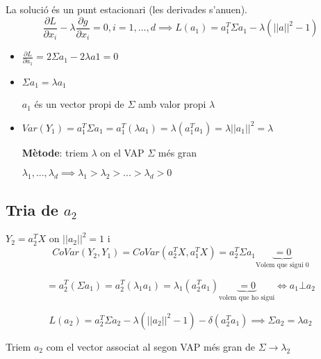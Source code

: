 \documentclass[a4paper]{article}
\begin{document}
La solució és un punt estacionari (les derivades s'anu\lgem en).
$$  \frac{\partial L}{\partial x_i} - \lambda \frac{\partial g}{\partial x_i} = 0, i = 1, ..., d \implies L(a_1) = a_1^T\Sigma a_1 - \lambda(||a||^2 - 1)  $$

\begin{itemize}
	\item $\frac{\partial L}{\partial a_1} = 2\Sigma a_1 - 2\lambda a1 = 0$
	\item $\Sigma a_1 = \lambda a_1$
	
	$a_1$ és un vector propi de $\Sigma$ amb valor propi $\lambda$
	\item $Var(Y_1) = a_1^T\Sigma a_1=a_1^T(\lambda a_1) = \lambda(a_1^T a_1) = \lambda ||a_1||^2 = \lambda$
	
	\textbf{Mètode}: triem $\lambda$ on el VAP $\Sigma$ més gran
	
	$\lambda_1, ..., \lambda_d \implies \lambda_1 > \lambda_2 > ... > \lambda_d > 0$
\end{itemize}

\subsection{Tria de $a_2$}

$Y_2 = a_2^TX$ on $||a_2||^2 = 1$ i $$ CoVar(Y_2, Y_1) = CoVar(a_2^TX, a_1^TX) = a_2^T\Sigma a_1 \underbrace{= 0}_\text{Volem que sigui 0} $$ 

$$  = a_2^T(\Sigma a_1) = a_2^T(\lambda_1 a_1) = \lambda_1 (a_2^Ta_1) \underbrace{= 0}_\text{volem que ho sigui} \Leftrightarrow a_1 \bot a_2  $$

$$  L(a_2) = a_2^T\Sigma a_2 - \lambda(||a_2||^2 - 1) - \delta(a_2^Ta_1) \implies \Sigma a_2 = \lambda a_2  $$

Triem $a_2$ com el vector associat al segon VAP més gran de $\Sigma \rightarrow \lambda_2$
\end{document}
